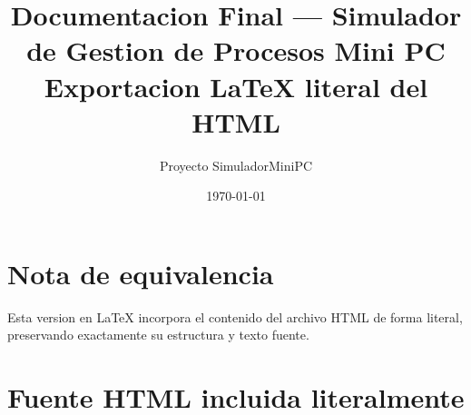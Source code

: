 \documentclass[11pt,a4paper]{article}
\title{Documentacion Final --- Simulador de Gestion de Procesos Mini PC\\\large Exportacion LaTeX literal del HTML}
\author{Proyecto SimuladorMiniPC}
\date{\today}
\begin{document}
\maketitle

\section*{Nota de equivalencia}
Esta version en LaTeX incorpora el contenido del archivo HTML de forma literal,
preservando exactamente su estructura y texto fuente.

\section*{Fuente HTML incluida literalmente}
\end{document}
